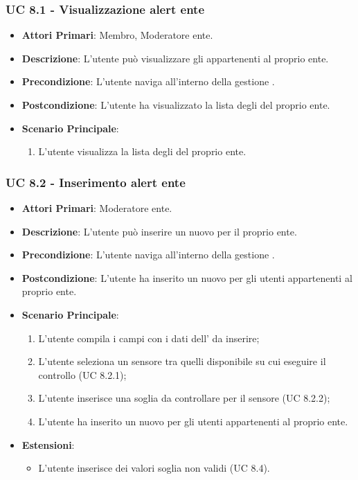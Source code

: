 			\subsubsection{UC 8.1 - Visualizzazione alert ente}
			\begin{itemize}
				\item \textbf{Attori Primari}: Membro, Moderatore ente.
				\item \textbf{Descrizione}: L'utente può visualizzare gli  appartenenti al proprio ente.
				\item \textbf{Precondizione}: L'utente naviga all'interno della gestione .
				\item \textbf{Postcondizione}: L'utente ha visualizzato la lista degli  del proprio ente.
				\item \textbf{Scenario Principale}:
				\begin{enumerate}
					\item{L'utente visualizza la lista degli  del proprio ente.}
				\end{enumerate}	
			\end{itemize}
			
			\subsubsection{UC 8.2 - Inserimento alert ente}
			\begin{itemize}
				\item \textbf{Attori Primari}: Moderatore ente.
				\item \textbf{Descrizione}: L'utente può inserire un nuovo  per il proprio ente.
				\item \textbf{Precondizione}: L'utente naviga all'interno della gestione .
				\item \textbf{Postcondizione}: L'utente ha inserito un nuovo  per gli utenti appartenenti al proprio ente.
				\item \textbf{Scenario Principale}:
				\begin{enumerate}
					\item{L'utente compila i campi con i dati dell' da inserire;}
					\item L'utente seleziona un sensore tra quelli disponibile su cui eseguire il controllo (UC 8.2.1);
					\item L'utente inserisce una soglia da controllare per il sensore (UC 8.2.2);
					\item{L'utente ha inserito un nuovo  per gli utenti appartenenti al proprio ente.}
				\end{enumerate}
				\item \textbf{Estensioni}:
				\begin{itemize}
					\item L'utente inserisce dei valori soglia non validi (UC 8.4).
				\end{itemize}		
			\end{itemize}
			
